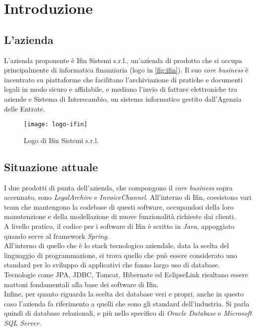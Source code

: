 
\chapter{Introduzione}
\label{cap:introduzione}

\section{L'azienda}

L'azienda proponente è Ifin Sistemi s.r.l., un'azienda di prodotto che si occupa principalmente di informatica finanziaria (logo in \autoref{fig:ifin}).
Il suo \textit{core business} è incentrato su piattaforme che facilitano l'archiviazione di pratiche e documenti legali in modo sicuro e affidabile, e mediano l'invio di fatture elettroniche tra aziende e Sistema di Interscambio, un sistema informatico gestito dall'Agenzia delle Entrate.

\vspace{15pt}
\begin{figure}[htbp]
\begin{center}
\texttt{[image: logo-ifin]}
\caption{Logo di Ifin Sistemi s.r.l.}
\label{fig:ifin}
\end{center}
\end{figure}
\vspace{15pt}

\section{Situazione attuale}

I due prodotti di punta dell'azienda, che compongono il \textit{core business} sopra accennato, sono \textit{LegalArchive} e \textit{InvoiceChannel}. All'interno di Ifin, coesistono vari team che mantengono la codebase di questi software, occupandosi della loro manutenzione e della modellazione di nuove funzionalità richieste dai clienti.\\
A livello pratico, il codice per i software di Ifin è scritto in \textit{Java}, appoggiato quando serve al framework \textit{Spring}.\\
All'interno di quello che è lo stack tecnologico aziendale, data la scelta del linguaggio di programmazione, si trova quello che può essere considerato uno standard per lo sviluppo di applicativi che fanno largo uso di database. Tecnologie come \gls{JPA}, \gls{JDBC}, \gls{Tomcat}, \gls{Hibernate} ed \gls{EclipseLink} risultano essere mattoni fondamentali alla base dei software di Ifin.\\
Infine, per quanto riguarda la scelta dei database veri e propri, anche in questo caso l'azienda fa riferimento a quelli che sono gli standard dell'industria. Si parla quindi di database relazionali, e più nello specifico di \textit{Oracle Database} e \textit{Microsoft SQL Server}.\\

